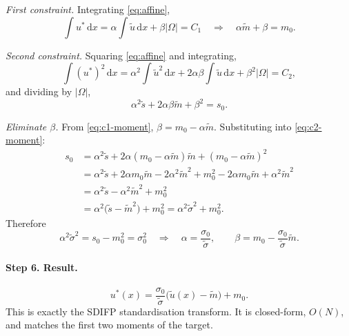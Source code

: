 \documentclass[11pt,a4paper]{article}
\theoremstyle{remark}
\newcommand{\dx}{\,\mathrm{d}x}
\newcommand{\ut}{\tilde{u}}
\newcommand{\us}{u^{*}}
\newcommand{\Om}{\Omega}
\begin{document}
\emph{First constraint.} Integrating \eqref{eq:affine},
\begin{equation}
\int\us\dx = \alpha\int\ut\dx + \beta|\Om| = C_1
\quad\Longrightarrow\quad
\alpha\tilde m + \beta = m_0 .
\label{eq:c1-moment}
\end{equation}

\emph{Second constraint.} Squaring \eqref{eq:affine} and integrating,
\begin{equation}
\int(\us)^2\dx = \alpha^2\int\ut^2\dx + 2\alpha\beta\int\ut\dx + \beta^2|\Om| = C_2,
\end{equation}
and dividing by $|\Om|$,
\begin{equation}
\alpha^2\tilde s + 2\alpha\beta\tilde m + \beta^2 = s_0 .
\label{eq:c2-moment}
\end{equation}

\emph{Eliminate $\beta$.} From \eqref{eq:c1-moment}, $\beta = m_0 - \alpha\tilde m$.
Substituting into \eqref{eq:c2-moment}:
\begin{align}
s_0 &= \alpha^2\tilde s + 2\alpha(m_0-\alpha\tilde m)\tilde m + (m_0-\alpha\tilde m)^2 \\
&= \alpha^2\tilde s + 2\alpha m_0\tilde m - 2\alpha^2\tilde m^2
   + m_0^2 - 2\alpha m_0\tilde m + \alpha^2\tilde m^2 \\
&= \alpha^2\tilde s - \alpha^2\tilde m^2 + m_0^2 \\
&= \alpha^2\big(\tilde s - \tilde m^2\big) + m_0^2
 = \alpha^2\tilde\sigma^2 + m_0^2 .
\end{align}
Therefore
\begin{equation}
\alpha^2\tilde\sigma^2 = s_0 - m_0^2 = \sigma_0^2
\quad\Longrightarrow\quad
\alpha = \frac{\sigma_0}{\tilde\sigma},
\qquad
\beta = m_0 - \frac{\sigma_0}{\tilde\sigma}\tilde m .
\end{equation}

\paragraph{Step 6. Result.}
\begin{equation}
\boxed{\ \us(x) = \frac{\sigma_0}{\tilde\sigma}\Big(\ut(x) - \tilde m\Big) + m_0 . \ }
\label{eq:proj-joint}
\end{equation}
This is exactly the SDIFP standardisation transform. It is closed-form, $O(N)$,
and matches the first two moments of the target.
\end{document}
